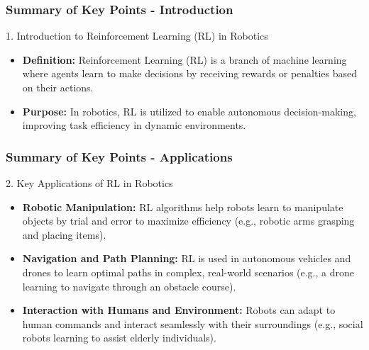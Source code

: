 \documentclass[aspectratio=169]{beamer}
\begin{document}
\begin{frame}[fragile]
    \frametitle{Summary of Key Points - Introduction}
    \begin{block}{1. Introduction to Reinforcement Learning (RL) in Robotics}
        \begin{itemize}
            \item \textbf{Definition:} Reinforcement Learning (RL) is a branch of machine learning where agents learn to make decisions by receiving rewards or penalties based on their actions.
            \item \textbf{Purpose:} In robotics, RL is utilized to enable autonomous decision-making, improving task efficiency in dynamic environments.
        \end{itemize}
    \end{block}
\end{frame}

\begin{frame}[fragile]
    \frametitle{Summary of Key Points - Applications}
    \begin{block}{2. Key Applications of RL in Robotics}
        \begin{itemize}
            \item \textbf{Robotic Manipulation:} RL algorithms help robots learn to manipulate objects by trial and error to maximize efficiency (e.g., robotic arms grasping and placing items).
            \item \textbf{Navigation and Path Planning:} RL is used in autonomous vehicles and drones to learn optimal paths in complex, real-world scenarios (e.g., a drone learning to navigate through an obstacle course).
            \item \textbf{Interaction with Humans and Environment:} Robots can adapt to human commands and interact seamlessly with their surroundings (e.g., social robots learning to assist elderly individuals).
        \end{itemize}
    \end{block}
\end{frame}
\end{document}
